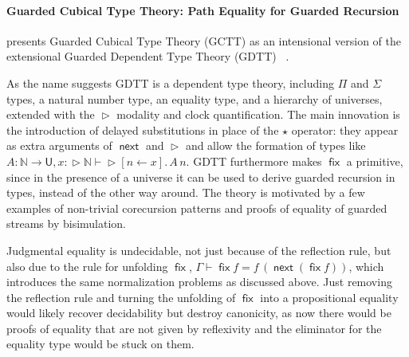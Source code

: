 \documentclass{book}
\DeclareMathOperator{\fix}{\mathsf{fix}}
\DeclareMathOperator{\Later}{\vartriangleright}
\DeclareMathOperator{\next}{\ensuremath{\mathsf{next}}}
\newcommand{\sd}{.\,}
\begin{document}

  \paragraph{Guarded Cubical Type Theory: Path Equality for Guarded Recursion}
  presents Guarded Cubical Type Theory (GCTT) as an intensional
  version of the extensional Guarded Dependent Type Theory (GDTT)
  ~\cite{gdtt}.

  As the name suggests GDTT is a dependent type theory, including
  $\Pi$ and $\Sigma$ types, a natural number type, an equality type, and a hierarchy of
  universes, extended with the $\Later$ modality and clock
  quantification. The main innovation is the introduction of delayed
  substitutions in place of the $\star$ operator: they appear as extra
  arguments of $\next$ and $\Later$ and allow the formation of types
  like $ A : \mathbb{N} \to \mathsf{U}, x : \Later \mathbb{N} \vdash
  \Later [n \leftarrow x]\sd A\,n$.
  GDTT furthermore makes $\fix$ a primitive, since in the presence of
  a universe it can be used to derive guarded recursion in types,
  instead of the other way around. The theory is motivated by a few
  examples of non-trivial corecursion patterns and proofs of equality
  of guarded streams by bisimulation.

  Judgmental equality is undecidable, not just because of the
  reflection rule, but also due to the rule for unfolding $\fix$,
  $\Gamma \vdash \fix f = f\,(\next (\fix f))$, which introduces the
  same normalization problems as discussed above. Just removing the
  reflection rule and turning the unfolding of $\fix$ into a
  propositional equality would likely recover decidability but destroy
  canonicity, as now there would be proofs of equality that are not
  given by reflexivity and the eliminator for the equality type would
  be stuck on them.
\end{document}
